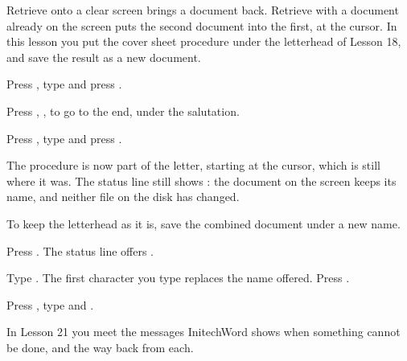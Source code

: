 Retrieve onto a clear screen brings a document back.  Retrieve with a
document already on the screen puts the second document into the first, at
the cursor.  In this lesson you put the cover sheet procedure under the
letterhead of Lesson 18, and save the result as a new document.

\begin{WPSteps}
\item Press , type  and press
.
\item Press , ,  to go to the end,
under the salutation.
\end{WPSteps}

\begin{WPSteps}
\item Press , type  and press
.
\end{WPSteps}
The procedure is now part of the letter, starting at the cursor, which is
still where it was.  The status line still shows : the
document on the screen keeps its name, and neither file on the disk has
changed.

To keep the letterhead as it is, save the combined document under a new
name.
\begin{WPSteps}
\item Press .  The status line offers .
\item Type .  The first character you type replaces the
name offered.  Press .
\end{WPSteps}

\begin{WPSteps}
\item Press , type  and .
\end{WPSteps}
\EndReplay
In Lesson 21 you meet the messages InitechWord shows when something cannot
be done, and the way back from each.
